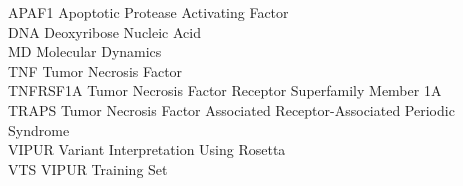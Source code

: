 APAF1 Apoptotic Protease Activating Factor\\
DNA Deoxyribose Nucleic Acid\\
MD	Molecular Dynamics\\
TNF Tumor Necrosis Factor\\
TNFRSF1A Tumor Necrosis Factor Receptor Superfamily Member 1A\\
TRAPS Tumor Necrosis Factor Associated Receptor-Associated Periodic Syndrome\\
VIPUR Variant Interpretation Using Rosetta\\
VTS VIPUR Training Set\\